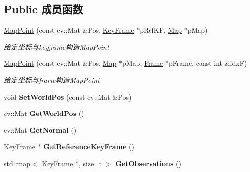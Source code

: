 \subsection*{Public 成员函数}
\begin{DoxyCompactItemize}
\item 
\hyperlink{classORB__SLAM2_1_1MapPoint_ae8b6d24a7f79cfd260502859cb5b6901}{Map\-Point} (const cv\-::\-Mat \&Pos, \hyperlink{classORB__SLAM2_1_1KeyFrame}{Key\-Frame} $\ast$p\-Ref\-K\-F, \hyperlink{classORB__SLAM2_1_1Map}{Map} $\ast$p\-Map)
\begin{DoxyCompactList}\small\item\em 给定坐标与keyframe构造\-Map\-Point \end{DoxyCompactList}\item 
\hyperlink{classORB__SLAM2_1_1MapPoint_abbb2b679ea956845f315a69773618fa7}{Map\-Point} (const cv\-::\-Mat \&Pos, \hyperlink{classORB__SLAM2_1_1Map}{Map} $\ast$p\-Map, \hyperlink{classORB__SLAM2_1_1Frame}{Frame} $\ast$p\-Frame, const int \&idx\-F)
\begin{DoxyCompactList}\small\item\em 给定坐标与frame构造\-Map\-Point \end{DoxyCompactList}\item 
\hypertarget{classORB__SLAM2_1_1MapPoint_ad65e6322e9d06314db235ff4d072509f}{void {\bfseries Set\-World\-Pos} (const cv\-::\-Mat \&Pos)}\label{classORB__SLAM2_1_1MapPoint_ad65e6322e9d06314db235ff4d072509f}

\item 
\hypertarget{classORB__SLAM2_1_1MapPoint_a0e59b21447d5d889b39ad2fcc1b1db49}{cv\-::\-Mat {\bfseries Get\-World\-Pos} ()}\label{classORB__SLAM2_1_1MapPoint_a0e59b21447d5d889b39ad2fcc1b1db49}

\item 
\hypertarget{classORB__SLAM2_1_1MapPoint_af0198d242a96476faa52da0ede3c8f10}{cv\-::\-Mat {\bfseries Get\-Normal} ()}\label{classORB__SLAM2_1_1MapPoint_af0198d242a96476faa52da0ede3c8f10}

\item 
\hypertarget{classORB__SLAM2_1_1MapPoint_a98f595f0421fd95e406d1de6f48e05f3}{\hyperlink{classORB__SLAM2_1_1KeyFrame}{Key\-Frame} $\ast$ {\bfseries Get\-Reference\-Key\-Frame} ()}\label{classORB__SLAM2_1_1MapPoint_a98f595f0421fd95e406d1de6f48e05f3}

\item 
\hypertarget{classORB__SLAM2_1_1MapPoint_ae91e056d3b79e08a3fadd976888f6b09}{std\-::map$<$ \hyperlink{classORB__SLAM2_1_1KeyFrame}{Key\-Frame} $\ast$, size\-\_\-t $>$ {\bfseries Get\-Observations} ()}\label{classORB__SLAM2_1_1MapPoint_ae91e056d3b79e08a3fadd976888f6b09}


\end{DoxyCompactItemize}
